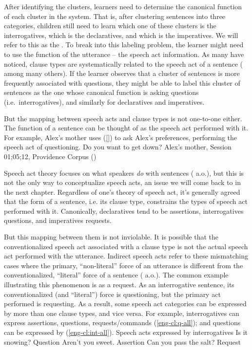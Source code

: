 After identifying the clusters, learners need to determine the canonical function of each cluster in the system. That is, after clustering sentences into three categories, children still need to learn which one of these clusters is the interrogatives, which is the declaratives, and which is the imperatives. We will refer to this as the . To break into this labeling problem, the learner might need to use the function of the utterance -- the speech act information. As many have noticed, clause types are systematically related to the speech act of a sentence (\cite{katzpostal1964, sz1985speechact, portner2018} among many others). If the learner observes that a cluster of sentences is more frequently associated with questions, they might be able to label this cluster of sentences as the one whose canonical function is asking questions (i.e.\ interrogatives), and similarly for declaratives and imperatives. 

But the mapping between speech acts and clause types is not one-to-one either. The function of a sentence can be thought of as the speech act performed with it. For example, Alex's mother uses (\ref{}) to ask Alex's preferences, performing the speech act of questioning.
\bex{}
Do you want to get down? \hfill Alex's mother, Session 01;05;12, Providence Corpus (\cite{ProvidenceCorpus})
\eex

Speech act theory focuses on what speakers \emph{do} with sentences (\cite{austin1975things, searle1969} a.o.), but this is not the only way to conceptualize speech acts, an issue we will come back to in the next chapter. Regardless of one's theory of speech act, it's generally agreed that the form of a sentence, i.e. its clause type, constrains the types of speech act performed with it. Canonically, declaratives tend to be assertions, interrogatives questions, and imperatives requests. 


But this mapping between them is not inviolable. It is possible that the conventionalized speech act associated with a clause type is not the actual speech act performed with the utterance. Indirect speech acts refer to these mismatching cases where the primary, ``non-literal'' force of an utterance is different from the conventionalized, ``literal'' force of a sentence (\citealt{searle1975tax, searle1976class, bachharnish1979, levinson1983, searlevanderveken1985, portner2018, starr2014, murraystarr2020} a.o.). The common example illustrating this phenomenon is  as a request. As an interrogative sentence, its conventionalized (and ``literal'') force is questioning, but the primary act performed is requesting. As a result, some speech act categories can be expressed by more than one clause types, and vice versa. For example, interrogatives can express assertions, questions, requests/commands (\ref{eng-cl:q-all}); and questions can be expressed by \diis{} (\ref{eng-cl:int-all}).
Speech acts expressed by interrogatives 
\bxl Is it snowing? \hfill Question
\ex Aren't you sweet. \hfill Assertion
\ex Can you pass the salt? \hfill Request
\exl
\eex

